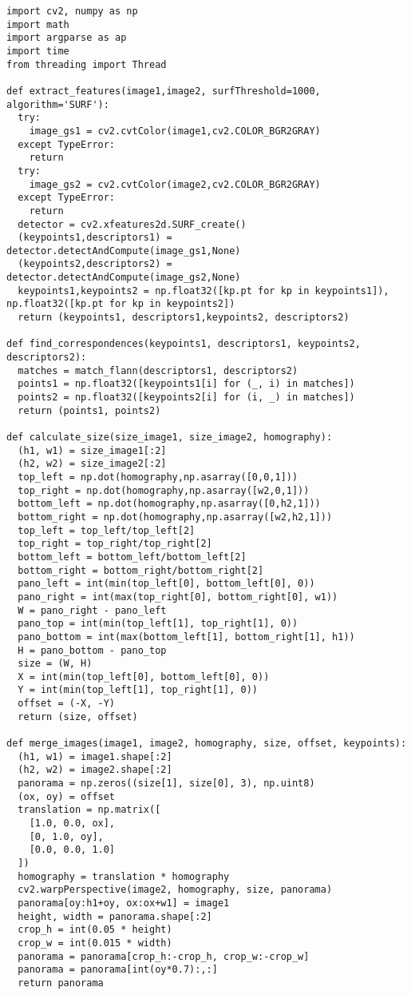 \begin{lstlisting}
import cv2, numpy as np
import math
import argparse as ap
import time
from threading import Thread

def extract_features(image1,image2, surfThreshold=1000, algorithm='SURF'):
  try:
    image_gs1 = cv2.cvtColor(image1,cv2.COLOR_BGR2GRAY)
  except TypeError:
    return
  try:
    image_gs2 = cv2.cvtColor(image2,cv2.COLOR_BGR2GRAY)
  except TypeError:
    return
  detector = cv2.xfeatures2d.SURF_create()
  (keypoints1,descriptors1) = detector.detectAndCompute(image_gs1,None)
  (keypoints2,descriptors2) = detector.detectAndCompute(image_gs2,None)
  keypoints1,keypoints2 = np.float32([kp.pt for kp in keypoints1]), np.float32([kp.pt for kp in keypoints2])
  return (keypoints1, descriptors1,keypoints2, descriptors2)

def find_correspondences(keypoints1, descriptors1, keypoints2, descriptors2):
  matches = match_flann(descriptors1, descriptors2)
  points1 = np.float32([keypoints1[i] for (_, i) in matches])
  points2 = np.float32([keypoints2[i] for (i, _) in matches])
  return (points1, points2)

def calculate_size(size_image1, size_image2, homography):
  (h1, w1) = size_image1[:2]
  (h2, w2) = size_image2[:2]
  top_left = np.dot(homography,np.asarray([0,0,1]))
  top_right = np.dot(homography,np.asarray([w2,0,1]))
  bottom_left = np.dot(homography,np.asarray([0,h2,1]))
  bottom_right = np.dot(homography,np.asarray([w2,h2,1]))
  top_left = top_left/top_left[2]
  top_right = top_right/top_right[2]
  bottom_left = bottom_left/bottom_left[2]
  bottom_right = bottom_right/bottom_right[2]
  pano_left = int(min(top_left[0], bottom_left[0], 0))
  pano_right = int(max(top_right[0], bottom_right[0], w1))
  W = pano_right - pano_left
  pano_top = int(min(top_left[1], top_right[1], 0))
  pano_bottom = int(max(bottom_left[1], bottom_right[1], h1))
  H = pano_bottom - pano_top
  size = (W, H)
  X = int(min(top_left[0], bottom_left[0], 0))
  Y = int(min(top_left[1], top_right[1], 0))
  offset = (-X, -Y)
  return (size, offset)

def merge_images(image1, image2, homography, size, offset, keypoints):
  (h1, w1) = image1.shape[:2]
  (h2, w2) = image2.shape[:2]
  panorama = np.zeros((size[1], size[0], 3), np.uint8)
  (ox, oy) = offset
  translation = np.matrix([
    [1.0, 0.0, ox],
    [0, 1.0, oy],
    [0.0, 0.0, 1.0]
  ])
  homography = translation * homography
  cv2.warpPerspective(image2, homography, size, panorama)
  panorama[oy:h1+oy, ox:ox+w1] = image1
  height, width = panorama.shape[:2]
  crop_h = int(0.05 * height)
  crop_w = int(0.015 * width)
  panorama = panorama[crop_h:-crop_h, crop_w:-crop_w]
  panorama = panorama[int(oy*0.7):,:]
  return panorama


\end{lstlisting}
